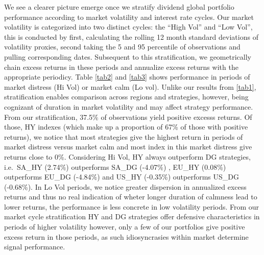 \documentclass[11pt,preprint, authoryear]{elsarticle}
\numberwithin{equation}{section}
\numberwithin{figure}{section}
\numberwithin{table}{section}
\begin{document}
We see a clearer picture emerge once we stratify dividend global
portfolio performance according to market volatility and interest rate
cycles. Our market volatility is categorized into two distinct cycles:
the ``High Vol'' and ``Low Vol'', this is conducted by first,
calculating the rolling 12 month standard deviations of volatility
proxies, second taking the 5 and 95 percentile of observations and
pulling corresponding dates. Subsequent to this stratification, we
geometrically chain excess returns in these periods and annualize excess
returns with the appropriate periodicy. Table \ref{tab2} and \ref{tab3}
shows performance in periods of market distress (Hi Vol) or market calm
(Lo vol). Unlike our results from \ref{tab1}, stratification enables
comparison across regions and strategies, however, being cognizant of
duration in market volatility and may affect strategy performance. From
our stratification, 37.5\% of observations yield positive excesss
returns. Of those, HY indexes (which make up a proportion of 67\% of
those with positive returns), we notice that most strategies give the
highest return in periods of market distress versus market calm and most
index in this market distress give returns close to 0\%. Considering Hi
Vol, HY always outperform DG strategies, i.e.~SA\_HY (2.74\%)
outperforms SA\_DG (-4.07\%) , EU\_HY (0.08\%) outperforms EU\_DG
(-4.84\%) and US\_HY (-0.35\%) outperforms US\_DG (-0.68\%). In Lo Vol
periods, we notice greater dispersion in annualized excess returns and
thus no real indication of wheter longer duration of calmness lead to
lower returns, the performance is less concrete in low volatility
periods. From our market cycle stratification HY and DG strategies offer
defensive characteristics in periods of higher volatility however, only
a few of our portfolios give positive excess return in those periods, as
such idiosyncrasies within market determine signal performance.
\end{document}
